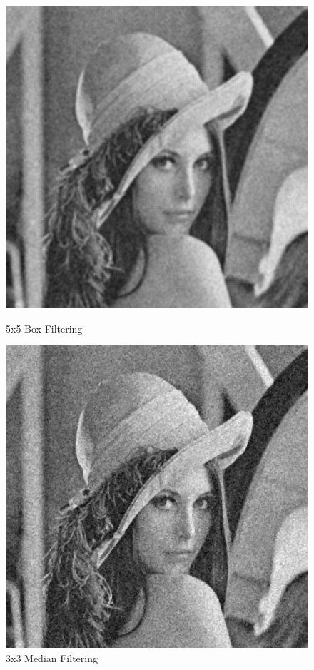 \documentclass{article}
\begin{document}
\begin{figure}[H]
  \includegraphics[width=\linewidth]{img/g30_box_5x5.png}
  \caption{5x5 Box Filtering}\label{fig:g30_box_5x5}
\endminipage\hfill
{}
  \includegraphics[width=\linewidth]{img/g30_median_3x3.png}
  \caption{3x3 Median Filtering}\label{fig:g30_median_3x3}
\endminipage\hfill
\end{figure}
\end{document}
